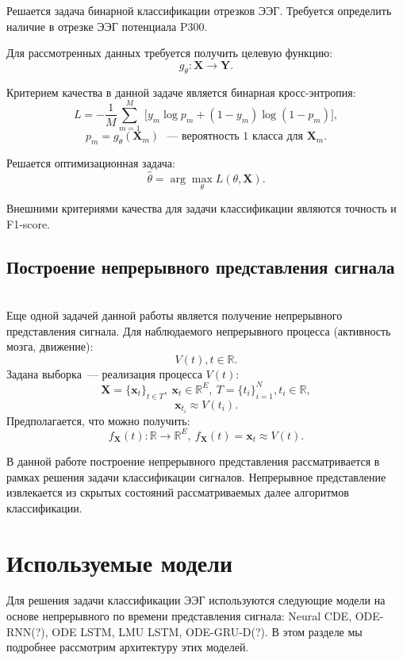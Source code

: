 \documentclass{article}
\newcommand{\x}{\mathbf{x}}
\newcommand{\Y}{\mathbf{Y}}
\newcommand{\X}{\mathbf{X}}
\newcommand{\R}{\mathbb{R}}
\begin{document}
    Решается задача бинарной классификации отрезков ЭЭГ. Требуется определить наличие в отрезке ЭЭГ потенциала P300.
    
    Для рассмотренных данных требуется получить целевую функцию:
    $$g_{\theta}: \X \to \Y.$$
    
    Критерием качества в данной задаче является бинарная кросс-энтропия: 
    $$L =  -{\frac {1}{M}}\sum _{m=1}^{M}\ {\bigg [}y_{m}\log {p}_{m}+(1-y_{m})\log(1-{p}_{m}){\bigg ]},$$
    $$p_m = g_{\theta}(\X_m) \text{ ~--- вероятность 1 класса для } \X_m.$$

    Решается оптимизационная задача:
    \begin{equation*}
    \hat{\theta} = \arg\max_{\theta} L(\theta, \X).
    \end{equation*}
    
    Внешними критериями качества для задачи классификации являются точность и F1-score.
    
\subsection{Построение непрерывного представления сигнала}\\
    
    Еще одной задачей данной работы является получение непрерывного представления сигнала. 
    Для наблюдаемого непрерывного процесса (активность мозга, движение):
    $$V(t), t \in \R.$$
    Задана выборка~--- реализация процесса $V(t)$:
    $$\X = \{\x_t\}_{t\in T},\  \x_t \in \R^E,\  T = \{t_i\}_{i=1}^{N}, t_i \in \R,$$ 
    $$\x_{t_i} \approx V(t_i).$$
    Предполагается, что можно получить:
    $$f_{\X}(t): \R \to \R^E, \ f_{\X}(t) = \x_t \approx V(t).$$

    В данной работе построение непрерывного представления рассматривается в рамках решения задачи классификации сигналов. Непрерывное представление извлекается из скрытых состояний рассматриваемых далее алгоритмов классификации.
    

\section{Используемые модели}

Для решения задачи классификации ЭЭГ используются следующие модели на основе непрерывного по времени представления сигнала: Neural CDE\cite{cde}, ODE-RNN\cite{NEURIPS2019_42a6845a}(?), ODE LSTM\cite{lechner2020longterm}, LMU LSTM\cite{NEURIPS2019_952285b9}, ODE-GRU-D\cite{Habiba2020NeuralOF}(?). В этом разделе мы подробнее рассмотрим архитектуру этих моделей.
\end{document}
